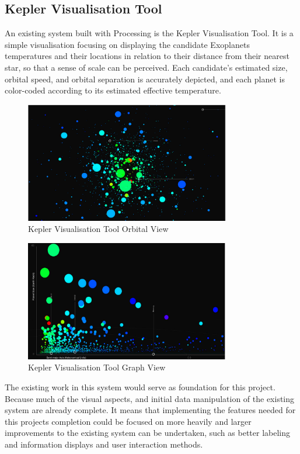 \subsection{Kepler Visualisation Tool}
An existing system built with Processing is the Kepler Visualisation Tool\cite{kepler_github, kepler_article}. It is a simple visualisation focusing on displaying the candidate Exoplanets temperatures and their locations in relation to their distance from their nearest star, so that a sense of scale can be perceived. Each candidate’s estimated size, orbital speed, and orbital separation is accurately depicted, and each planet is color-coded according to its estimated effective temperature.
\begin{figure}[h!]
  \centering
      \includegraphics[width=0.8\textwidth]{images/kepler_orbital.jpg}
  \caption{Kepler Visualisation Tool Orbital View}
\end{figure}
\begin{figure}[h!]
  \centering
      \includegraphics[width=0.8\textwidth]{images/kepler_graph.jpg}
  \caption{Kepler Visualisation Tool Graph View}
\end{figure}
The existing work in this system would serve as foundation for this project. Because much of the visual aspects, and initial data manipulation of the existing system are already complete. It means that implementing the features needed for this projects completion could be focused on more heavily and larger improvements to the existing system can be undertaken, such as better labeling and information displays and user interaction methods.